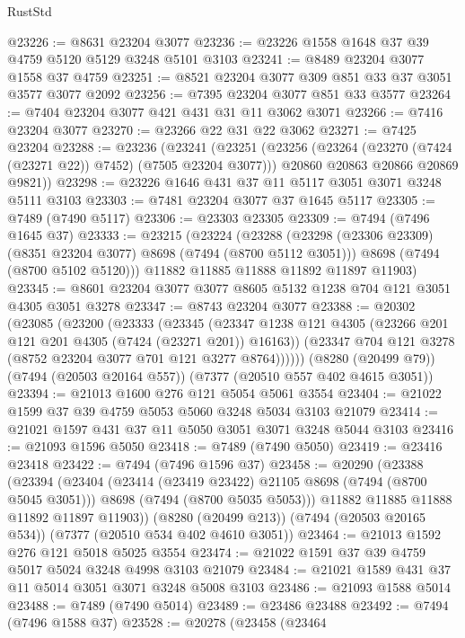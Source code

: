 \begin{lexlean}{RustStd}
\begin{coremodule}
@23226 := @8631 @23204 @3077
@23236 := @23226 @1558 @1648 @37 @39 @4759 @5120 @5129 @3248 @5101 @3103
@23241 := @8489 @23204 @3077 @1558 @37 @4759
@23251 := @8521 @23204 @3077 @309 @851 @33 @37 @3051 @3577 @3077 @2092
@23256 := @7395 @23204 @3077 @851 @33 @3577
@23264 := @7404 @23204 @3077 @421 @431 @31 @11 @3062 @3071
@23266 := @7416 @23204 @3077
@23270 := @23266 @22 @31 @22 @3062
@23271 := @7425 @23204
@23288 := @23236
    (@23241
      (@23251
        (@23256 (@23264 (@23270 (@7424 (@23271 @22)) @7452) (@7505 @23204 @3077)))
        @20860
        @20863
        @20866
        @20869
        @9821))
@23298 := @23226 @1646 @431 @37 @11 @5117 @3051 @3071 @3248 @5111 @3103
@23303 := @7481 @23204 @3077 @37 @1645 @5117
@23305 := @7489 (@7490 @5117)
@23306 := @23303 @23305
@23309 := @7494 (@7496 @1645 @37)
@23333 := @23215
    (@23224
      (@23288
        (@23298 (@23306 @23309) (@8351 @23204 @3077) @8698 (@7494 (@8700 @5112 @3051)))
        @8698
        (@7494 (@8700 @5102 @5120)))
      @11882
      @11885
      @11888
      @11892
      @11897
      @11903)
@23345 := @8601 @23204 @3077 @3077 @8605 @5132 @1238 @704 @121 @3051 @4305 @3051 @3278
@23347 := @8743 @23204 @3077
@23388 := @20302
    (@23085
      (@23200
        (@23333
          (@23345
            (@23347 @1238 @121 @4305 (@23266 @201 @121 @201 @4305 (@7424 (@23271 @201)) @16163))
            (@23347 @704 @121 @3278 (@8752 @23204 @3077 @701 @121 @3277 @8764))))))
    (@8280 (@20499 @79))
    (@7494 (@20503 @20164 @557))
    (@7377 (@20510 @557 @402 @4615 @3051))
@23394 := @21013 @1600 @276 @121 @5054 @5061 @3554
@23404 := @21022 @1599 @37 @39 @4759 @5053 @5060 @3248 @5034 @3103 @21079
@23414 := @21021 @1597 @431 @37 @11 @5050 @3051 @3071 @3248 @5044 @3103
@23416 := @21093 @1596 @5050
@23418 := @7489 (@7490 @5050)
@23419 := @23416 @23418
@23422 := @7494 (@7496 @1596 @37)
@23458 := @20290
    (@23388
      (@23394
        (@23404
          (@23414 (@23419 @23422) @21105 @8698 (@7494 (@8700 @5045 @3051)))
          @8698
          (@7494 (@8700 @5035 @5053)))
        @11882
        @11885
        @11888
        @11892
        @11897
        @11903))
    (@8280 (@20499 @213))
    (@7494 (@20503 @20165 @534))
    (@7377 (@20510 @534 @402 @4610 @3051))
@23464 := @21013 @1592 @276 @121 @5018 @5025 @3554
@23474 := @21022 @1591 @37 @39 @4759 @5017 @5024 @3248 @4998 @3103 @21079
@23484 := @21021 @1589 @431 @37 @11 @5014 @3051 @3071 @3248 @5008 @3103
@23486 := @21093 @1588 @5014
@23488 := @7489 (@7490 @5014)
@23489 := @23486 @23488
@23492 := @7494 (@7496 @1588 @37)
@23528 := @20278
    (@23458
      (@23464

\end{coremodule}
\end{lexlean}
